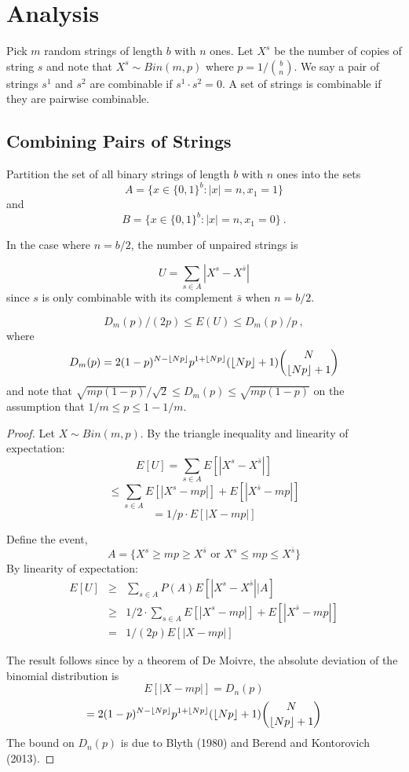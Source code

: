 \section{Analysis}
\label{sec:analysis}

Pick $m$ random strings of length $b$ with $n$ ones.
Let $X^s$ be the number of copies of string $s$ and note that $X^s \sim Bin(m,p)$ where $p=1/{b \choose n}$. 
We say a pair of strings $s^1$ and $s^2$ are combinable if $s^1\cdot s^2=0$. A set of strings is combinable if they are pairwise combinable.

\subsection{Combining Pairs of Strings}

Partition the set of all binary strings of length $b$ with $n$ ones into the sets
\[A=\{x\in \{0,1\}^b: |x|=n, x_1=1\}\] and \[
B=\{x\in \{0,1\}^b: |x|=n, x_1=0\} \ .\]


In the case where $n=b/2$, the number of unpaired strings is 

\[U=\sum_{s\in A} |X^s-X^{\bar{s}}|\] 
since $s$ is only combinable with its complement $\bar{s}$ when $n=b/2$.

\begin{theorem}
\[D_m(p)/(2p) \leq E(U) \leq D_m(p)/p \ ,\]
where 
\[D_m(p)=2(1-p)^{N-\left \lfloor Np \right \rfloor}p^{1+\left \lfloor Np \right \rfloor}(\left \lfloor Np \right \rfloor+1){N\choose \left \lfloor Np \right \rfloor+1}\]
and note that $\sqrt{mp(1-p)}/\sqrt{2} \leq D_m(p)\leq \sqrt{mp(1-p)}$ on the assumption that $1/m\leq p\leq 1-1/m$.
\end{theorem}
\begin{proof}
Let $X\sim Bin(m,p)$.
By the triangle inequality and linearity of expectation:
\[E[U]=\sum_{s\in A} E[|X^s-X^{\bar{s}}|]\]
\[\leq \sum_{s\in A} E[|X^s-mp|] + E[|X^{\bar{s}}-mp|]\]
\[=1/p \cdot E[|X-mp|]\]

Define the event,
\[A=\{X^s\geq mp\geq X^{\bar{s}} \mbox{ or } X^s\leq mp\leq  X^{\bar{s}}\}\]
By linearity of expectation:
\begin{eqnarray*}
E[U]
& \geq & 
\sum_{s\in A} P(A) 
E[|X^s-X^{\bar{s}}| \big | A] \\
& \geq & 1/2 \cdot 
\sum_{s\in A} E[|X^s-mp|] + E[|X^{\bar{s}}-mp|]\\
& = & 1/(2p)  E[|X-mp|]
\end{eqnarray*}

The result follows since by a theorem of De Moivre, the absolute deviation of the binomial distribution is 
\[E[|X-mp|]=D_n(p)\]
\[=2(1-p)^{N-\left \lfloor Np \right \rfloor}p^{1+\left \lfloor Np \right \rfloor}(\left \lfloor Np \right \rfloor+1){N\choose \left \lfloor Np \right \rfloor+1}\] 
The bound on $D_n(p)$ is due to Blyth (1980) and  Berend and  Kontorovich (2013).
\end{proof}


